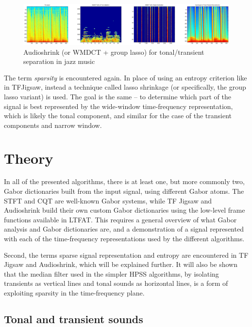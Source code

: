 \documentclass[letter,12pt]{article}
\begin{document}
\begin{figure}[ht]
	\centering
	\includegraphics[width=16cm]{./wmdctjazz.png}
	\caption{Audioshrink (or WMDCT + group lasso) for tonal/transient separation in jazz music}
	\label{fig:wmdctex}
\end{figure}

The term \textit{sparsity} is encountered again. In place of using an entropy criterion like in TFJigsaw, instead a technique called lasso shrinkage (or specifically, the group lasso variant) is used. The goal is the same -- to determine which part of the signal is best represented by the wide-window time-frequency representation, which is likely the tonal component, and similar for the case of the transient components and narrow window.

\section{Theory}
\label{sec:theory}

In all of the presented algorithms, there is at least one, but more commonly two, Gabor dictionaries built from the input signal, using different Gabor atoms. The STFT and CQT are well-known Gabor systems, while TF Jigsaw and Audioshrink build their own custom Gabor dictionaries using the low-level frame functions available in LTFAT. This requires a general overview of what Gabor analysis and Gabor dictionaries are, and a demonstration of a signal represented with each of the time-frequency representations used by the different algorithms.

Second, the terms sparse signal representation and entropy are encountered in TF Jigsaw and Audioshrink, which will be explained further. It will also be shown that the median filter used in the simpler HPSS algorithms, by isolating transients as vertical lines and tonal sounds as horizontal lines, is a form of exploiting sparsity in the time-frequency plane.

\subsection{Tonal and transient sounds}
\end{document}
